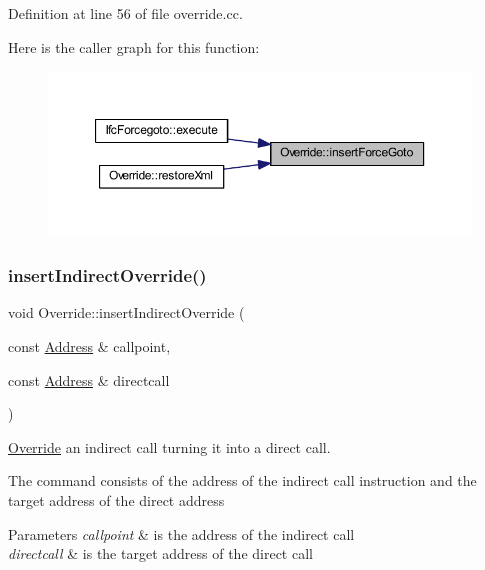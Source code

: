 Definition at line 56 of file override.\+cc.

Here is the caller graph for this function\+:
\nopagebreak
\begin{figure}[H]
\begin{center}
\leavevmode
\includegraphics[width=350pt]{class_override_a124d24114684c22e3f001c910763fae1_icgraph}
\end{center}
\end{figure}
\mbox{\label{class_override_a244525d6ba415aab3769255c79ab7ba8}} 
\subsubsection{\texorpdfstring{insertIndirectOverride()}{insertIndirectOverride()}}
{\footnotesize\ttfamily void Override\+::insert\+Indirect\+Override (\begin{DoxyParamCaption}\item[{const \mbox{\hyperlink{class_address}{Address}} \&}]{callpoint,  }\item[{const \mbox{\hyperlink{class_address}{Address}} \&}]{directcall }\end{DoxyParamCaption})}



\mbox{\hyperlink{class_override}{Override}} an indirect call turning it into a direct call. 

The command consists of the address of the indirect call instruction and the target address of the direct address 
\begin{DoxyParams}{Parameters}
{\em callpoint} & is the address of the indirect call \\
\hline
{\em directcall} & is the target address of the direct call \\
\hline
\end{DoxyParams}



